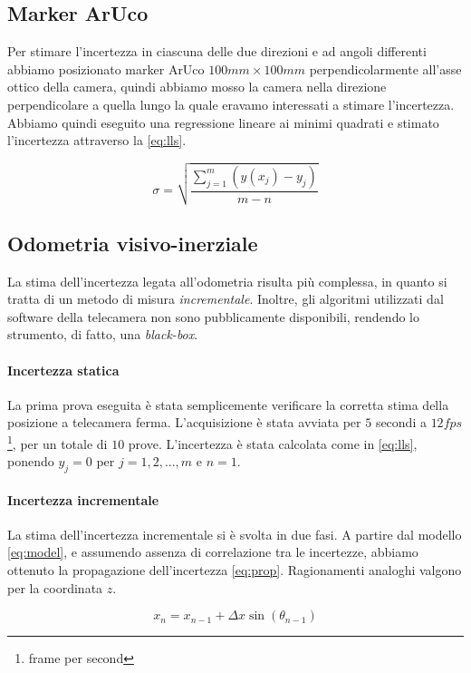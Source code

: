 \documentclass[
	a4paper, %
	10pt, %
]{LTJournalArticle}
\begin{document}
\subsection{Marker ArUco}

Per stimare l'incertezza in ciascuna delle due direzioni e ad angoli differenti abbiamo posizionato marker ArUco $100mm\times100mm$ perpendicolarmente all'asse ottico della camera, quindi abbiamo mosso la camera nella direzione perpendicolare a quella lungo la quale eravamo interessati a stimare l'incertezza. Abbiamo quindi eseguito una regressione lineare ai minimi quadrati e stimato l'incertezza attraverso la \ref{eq:lls}.

\begin{equation}
    \sigma = \sqrt{\frac{\sum_{j=1}^{m}(y(x_{j})-y_{j})}{m-n}}
    \label{eq:lls}
\end{equation}

\subsection{Odometria visivo-inerziale}

La stima dell'incertezza legata all'odometria risulta più complessa, in quanto si tratta di un metodo di misura \emph{incrementale}. Inoltre, gli algoritmi utilizzati dal software della telecamera non sono pubblicamente disponibili, rendendo lo strumento, di fatto, una \emph{black-box}.
\paragraph{Incertezza statica} La prima prova eseguita è stata semplicemente verificare la corretta stima della posizione a telecamera ferma. L'acquisizione è stata avviata per $5$ secondi a $12 fps$ \footnote{frame per second}, per un totale di $10$ prove. L'incertezza è stata calcolata come in \ref{eq:lls}, ponendo $y_{j}=0$ per $j=1,2,...,m$ e
$n=1$.
\paragraph{Incertezza incrementale} La stima dell'incertezza incrementale si è svolta in due fasi. A partire dal modello \ref{eq:model}, e assumendo assenza di correlazione tra le incertezze, abbiamo ottenuto la propagazione dell'incertezza \ref{eq:prop}. Ragionamenti analoghi valgono per la coordinata $z$.

\begin{equation}
        x_n =x_{n-1}+\Delta x  \sin{(\theta_{n-1})}
    \label{eq:model}
\end{equation}
\end{document}

